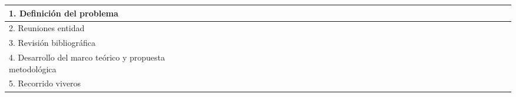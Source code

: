 \begin{table}[htbp]
{\begin{tabular}{|lr|r|r|r|r|r|r|r|r|r|r|r|r|r|r|r|r|r|r|r|r|r|r|r|r|r|r|r|r|r|r|r|r|r|r|r|r|}
    \hline
    \multicolumn{2}{|l|}{1. Definici\'{o}n del problema} & \cellcolor[rgb]{ .357,  .608,  .835} & \cellcolor[rgb]{ .357,  .608,  .835} & \cellcolor[rgb]{ .357,  .608,  .835} & \cellcolor[rgb]{ .357,  .608,  .835} &       &       &       &       &       &       &       &       &       &       &       &       &       &       &       &       &       &       &       &       &       &       &       &       &       &       &       &       &       &       &       &  \\
    \hline
    \multicolumn{2}{|l|}{2. Reuniones entidad} &       &       &       &       & \cellcolor[rgb]{ .357,  .608,  .835} &       &       &       & \cellcolor[rgb]{ .357,  .608,  .835} &       &       &       &       &       &       &       &       &       &       &       &       &       &       &       &       &       &       &       & \cellcolor[rgb]{ .357,  .608,  .835} &       &       &       &       &       &       &  \\
    \hline
    \multicolumn{2}{|l|}{3. Revisi\'{o}n bibliogr\'{a}fica} &       &       &       &       & \cellcolor[rgb]{ .357,  .608,  .835} & \cellcolor[rgb]{ .357,  .608,  .835} & \cellcolor[rgb]{ .357,  .608,  .835} & \cellcolor[rgb]{ .357,  .608,  .835} & \cellcolor[rgb]{ .357,  .608,  .835} & \cellcolor[rgb]{ .357,  .608,  .835} & \cellcolor[rgb]{ .357,  .608,  .835} & \cellcolor[rgb]{ .357,  .608,  .835} & \cellcolor[rgb]{ .357,  .608,  .835} & \cellcolor[rgb]{ .357,  .608,  .835} & \cellcolor[rgb]{ .357,  .608,  .835} & \cellcolor[rgb]{ .357,  .608,  .835} &       &       &       &       &       &       &       &       &       &       &       &       &       &       &       &       &       &       &       &  \\
    \hline
    \multicolumn{2}{|l|}{4. Desarrollo del marco te\'{o}rico y propuesta metodol\'{o}gica} &       &       &       &       &       &       &       &       &       &       &       &       &       &       &       &       & \cellcolor[rgb]{ .357,  .608,  .835} & \cellcolor[rgb]{ .357,  .608,  .835} & \cellcolor[rgb]{ .357,  .608,  .835} & \cellcolor[rgb]{ .357,  .608,  .835} & \cellcolor[rgb]{ .357,  .608,  .835} & \cellcolor[rgb]{ .357,  .608,  .835} & \cellcolor[rgb]{ .357,  .608,  .835} & \cellcolor[rgb]{ .357,  .608,  .835} & \cellcolor[rgb]{ .357,  .608,  .835} & \cellcolor[rgb]{ .357,  .608,  .835} & \cellcolor[rgb]{ .357,  .608,  .835} & \cellcolor[rgb]{ .357,  .608,  .835} &       &       &       &       &       &       &       &  \\
    \hline
    \multicolumn{2}{|l|}{5. Recorrido viveros} &       &       &       &       &       &       &       &       &       &       &       &       &       &       &       &       &       &       &       &       &       &       &       &       &       &       &       &       & \cellcolor[rgb]{ .357,  .608,  .835} & \cellcolor[rgb]{ .357,  .608,  .835} & \cellcolor[rgb]{ .357,  .608,  .835} & \cellcolor[rgb]{ .357,  .608,  .835} &       &       &       &  \\

\end{tabular}}
\end{table}
